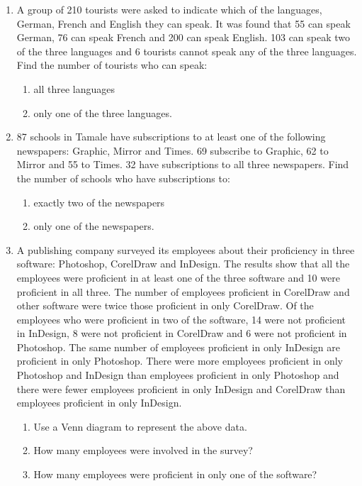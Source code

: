 \begin{enumerate}[resume]
\item A group of 210 tourists were asked to indicate which of the languages,
German, French and English they can speak. It was found that 55 can
speak German, 76 can speak French and 200 can speak English. 103 can
speak two of the three languages and 6 tourists cannot speak any of the
three languages. Find the number of tourists who can speak:
\begin{enumerate}
  \item[a.] all three languages
  \item[b.] only one of the three languages.
\end{enumerate}

\item 87 schools in Tamale have subscriptions to at least one of the following
newspapers: Graphic, Mirror and Times. 69 subscribe to Graphic, 62 to
Mirror and 55 to Times. 32 have subscriptions to all three newspapers.
Find the number of schools who have subscriptions to:
\begin{enumerate}
  \item[a.] exactly two of the newspapers
  \item[b.] only one of the newspapers.
\end{enumerate}

\item A publishing company surveyed its employees about their proficiency in
three software: Photoshop, CorelDraw and InDesign. The results show that
all the employees were proficient in at least one of the three software and
10 were proficient in all three. The number of employees proficient in
CorelDraw and other software were twice those proficient in only
CorelDraw. Of the employees who were proficient in two of the software,
14 were not proficient in InDesign, 8 were not proficient in CorelDraw and
6 were not proficient in Photoshop. The same number of employees
proficient in only InDesign are proficient in only Photoshop. There were
more employees proficient in only Photoshop and InDesign than employees
proficient in only Photoshop and there were fewer employees proficient in
only InDesign and CorelDraw than employees proficient in only InDesign.
\begin{enumerate}
  \item[a.] Use a Venn diagram to represent the above data.
  \item[b.] How many employees were involved in the survey?
  \item[c.] How many employees were proficient in only one of the software?
\end{enumerate}

\end{enumerate}

